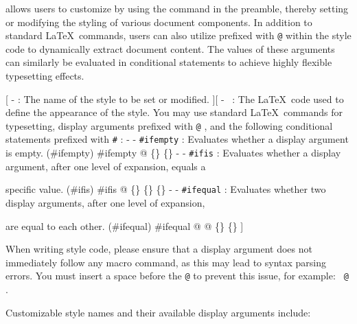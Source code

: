 
\SimpleSystemTeX allows users to customize  by using the  command in the preamble, thereby setting or modifying the styling of various document components. In addition to standard \LaTeX\ commands, users can also utilize  prefixed with \texttt{@} within the style code to dynamically extract document content. The values of these arguments can similarly be evaluated in conditional statements to achieve highly flexible typesetting effects.

[
    -  : The name of the style to be set or modified.
][
    - \longarg\ : The \LaTeX\ code used to define the appearance of the style. You may use standard \LaTeX\ commands for typesetting, display arguments prefixed with \texttt{@} , and the following conditional statements prefixed with \texttt{\#} :
        - - \texttt{\#ifempty} : Evaluates whether a display argument is empty.
        (\#ifempty){
            \upshape
            \#ifempty
            @
            \{\longarg\}
            \{\longarg\}
        }
        - - \texttt{\#ifis} : Evaluates whether a display argument, after one level of expansion, equals a
        \par\indent\indent\indent\indent specific value.
        (\#ifis){
            \upshape
            \#ifis
            @
            \{\}
            \{\longarg\}
            \{\longarg\}
        }
        - - \texttt{\#ifequal} : Evaluates whether two display arguments, after one level of expansion,
        \par\indent\indent\indent\indent\indent are equal to each other.
        (\#ifequal){
            \upshape
            \#ifequal
            @
            @
            \{\longarg\}
            \{\longarg\}
        }
]

When writing style code, please ensure that a display argument does not immediately follow any macro command, as this may lead to syntax parsing errors. You must insert a space before the \texttt{@} to prevent this issue, for example: \texttt{ @} .

\newpage Customizable style names and their available display arguments include:

